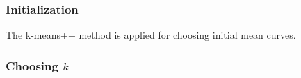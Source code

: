		\subsubsection*{Initialization}
			The k-means++ method is applied for choosing initial mean curves.

		\subsubsection*{Choosing $k$}
			



		


		
			


